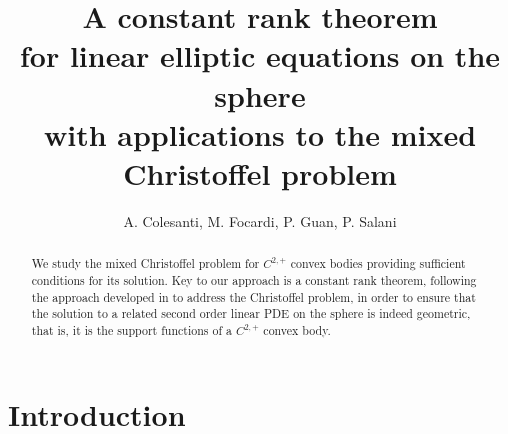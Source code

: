 \documentclass[12pt]{amsart}
\newcommand{\1}{\mathbf 1}
\begin{document}
\title[]{A constant rank theorem\\
for linear elliptic equations on the sphere\\
with applications to the mixed Christoffel problem}
\author[A. Colesanti, M. Focardi, P. Guan, P. Salani]{A. Colesanti, M. Focardi, P. Guan, P. Salani}
\address{Dipartimento di Matematica e Informatica ``U. Dini", Universit\`a degli Studi di Firenze}
\address{Dipartimento di Matematica e Informatica ``U. Dini", Universit\`a degli Studi di Firenze}
\address{Department of Math. \& Stats, McGill University}
\address{Dipartimento di Matematica e Informatica ``U. Dini", Universit\`a degli Studi di Firenze}
\begin{abstract} 
We study the mixed Christoffel problem for $C^{2,+}$ convex bodies providing sufficient conditions for its solution. Key to our approach is a constant rank theorem, following the approach developed in \cite{Guan-Ma-2003} to address the Christoffel problem, in order to ensure that the solution to a related second order linear PDE on the sphere is indeed geometric, that is, it is the support functions of a $C^{2,+}$ convex body. 
\end{abstract} 

\maketitle

\section{Introduction}
\end{document}
